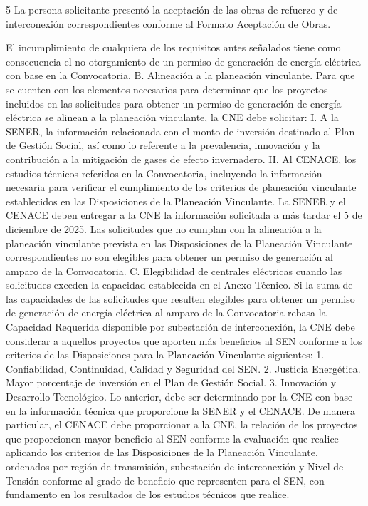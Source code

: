  
 5
 La persona solicitante presentó la aceptación de las obras de refuerzo y de interconexión correspondientes conforme al Formato Aceptación de Obras.
 
 
 
El incumplimiento de cualquiera de los requisitos antes señalados tiene como consecuencia el no otorgamiento de un permiso de generación de energía eléctrica con base en la Convocatoria.
B. Alineación a la planeación vinculante.
Para que se cuenten con los elementos necesarios para determinar que los proyectos incluidos en las solicitudes para obtener un permiso de generación de energía eléctrica se alinean a la planeación vinculante, la CNE debe solicitar:
I.	A la SENER, la información relacionada con el monto de inversión destinado al Plan de Gestión Social, así como lo referente a la prevalencia, innovación y la contribución a la mitigación de gases de efecto invernadero.
II.	Al CENACE, los estudios técnicos referidos en la Convocatoria, incluyendo la información necesaria para verificar el cumplimiento de los criterios de planeación vinculante establecidos en las Disposiciones de la Planeación Vinculante.
La SENER y el CENACE deben entregar a la CNE la información solicitada a más tardar el 5 de diciembre de 2025.
Las solicitudes que no cumplan con la alineación a la planeación vinculante prevista en las Disposiciones de la Planeación Vinculante correspondientes no son elegibles para obtener un permiso de generación al amparo de la Convocatoria.
C. Elegibilidad de centrales eléctricas cuando las solicitudes exceden la capacidad establecida en el Anexo Técnico.
Si la suma de las capacidades de las solicitudes que resulten elegibles para obtener un permiso de generación de energía eléctrica al amparo de la Convocatoria rebasa la Capacidad Requerida disponible por subestación de interconexión, la CNE debe considerar a aquellos proyectos que aporten más beneficios al SEN conforme a los criterios de las Disposiciones para la Planeación Vinculante siguientes:
1.	Confiabilidad, Continuidad, Calidad y Seguridad del SEN.
2.	Justicia Energética. Mayor porcentaje de inversión en el Plan de Gestión Social.
3.	Innovación y Desarrollo Tecnológico.
Lo anterior, debe ser determinado por la CNE con base en la información técnica que proporcione la SENER y el CENACE.
De manera particular, el CENACE debe proporcionar a la CNE, la relación de los proyectos que proporcionen mayor beneficio al SEN conforme la evaluación que realice aplicando los criterios de las Disposiciones de la Planeación Vinculante, ordenados por región de transmisión, subestación de interconexión y Nivel de Tensión conforme al grado de beneficio que representen para el SEN, con fundamento en los resultados de los estudios técnicos que realice.\par
